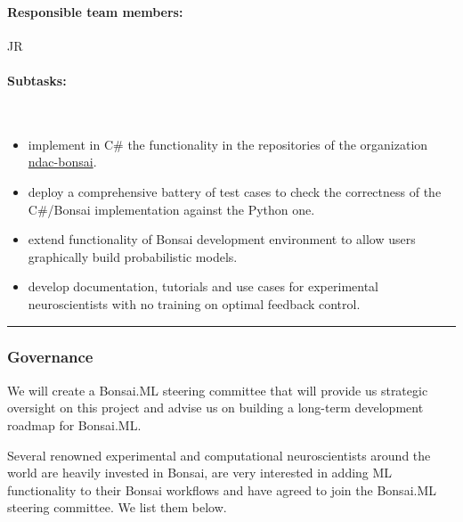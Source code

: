 \paragraph{Responsible team members:} JR

\paragraph{Subtasks:}\mbox{}\\

\begin{itemize}

    \item implement in C\# the functionality in the repositories of the
        organization \href{https://github.com/ndac-bonsai}{ndac-bonsai}.

    \item deploy a comprehensive battery of test cases to check the correctness
        of the C\#/Bonsai implementation against the Python one.

    \item extend functionality of Bonsai development environment to allow users
        graphically build probabilistic models.

    \item develop documentation, tutorials and use cases for experimental
        neuroscientists with no training on optimal feedback control.

\end{itemize}

\noindent\rule{\textwidth}{1pt}
\subsubsection*{Governance}

We will create a Bonsai.ML steering committee that will provide us strategic
oversight on this project and advise us on building a long-term development
roadmap for Bonsai.ML.

Several renowned experimental and computational neuroscientists around the
world are heavily invested in Bonsai, are very interested in adding ML
functionality to their Bonsai workflows and have agreed to join the Bonsai.ML
steering committee. We list them below.

